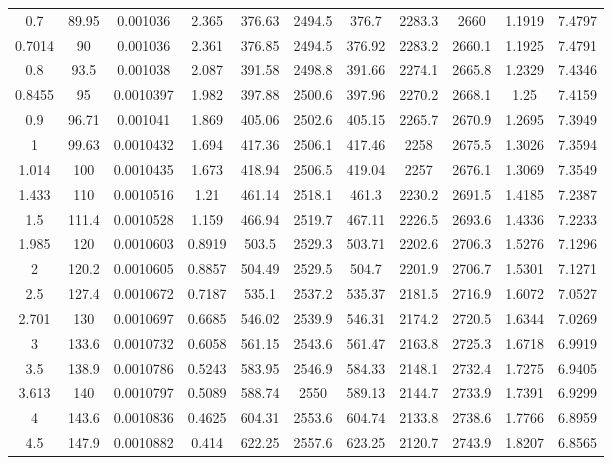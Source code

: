 \begin{longtable}{ccccccccccc}
	0.7     & 89.95 & 0.001036  & 2.365    & 376.63 & 2494.5 & 376.7  & 2283.3 & 2660   & 1.1919 & 7.4797      \\
	0.7014  & 90    & 0.001036  & 2.361    & 376.85 & 2494.5 & 376.92 & 2283.2 & 2660.1 & 1.1925 & 7.4791      \\
	0.8     & 93.5  & 0.001038  & 2.087    & 391.58 & 2498.8 & 391.66 & 2274.1 & 2665.8 & 1.2329 & 7.4346      \\
	0.8455  & 95    & 0.0010397 & 1.982    & 397.88 & 2500.6 & 397.96 & 2270.2 & 2668.1 & 1.25   & 7.4159      \\
	0.9     & 96.71 & 0.001041  & 1.869    & 405.06 & 2502.6 & 405.15 & 2265.7 & 2670.9 & 1.2695 & 7.3949      \\
	1       & 99.63 & 0.0010432 & 1.694    & 417.36 & 2506.1 & 417.46 & 2258   & 2675.5 & 1.3026 & 7.3594      \\
	1.014   & 100   & 0.0010435 & 1.673    & 418.94 & 2506.5 & 419.04 & 2257   & 2676.1 & 1.3069 & 7.3549      \\
	1.433   & 110   & 0.0010516 & 1.21     & 461.14 & 2518.1 & 461.3  & 2230.2 & 2691.5 & 1.4185 & 7.2387      \\
	1.5     & 111.4 & 0.0010528 & 1.159    & 466.94 & 2519.7 & 467.11 & 2226.5 & 2693.6 & 1.4336 & 7.2233      \\
	1.985   & 120   & 0.0010603 & 0.8919   & 503.5  & 2529.3 & 503.71 & 2202.6 & 2706.3 & 1.5276 & 7.1296      \\
	2       & 120.2 & 0.0010605 & 0.8857   & 504.49 & 2529.5 & 504.7  & 2201.9 & 2706.7 & 1.5301 & 7.1271      \\
	2.5     & 127.4 & 0.0010672 & 0.7187   & 535.1  & 2537.2 & 535.37 & 2181.5 & 2716.9 & 1.6072 & 7.0527      \\
	2.701   & 130   & 0.0010697 & 0.6685   & 546.02 & 2539.9 & 546.31 & 2174.2 & 2720.5 & 1.6344 & 7.0269      \\
	3       & 133.6 & 0.0010732 & 0.6058   & 561.15 & 2543.6 & 561.47 & 2163.8 & 2725.3 & 1.6718 & 6.9919      \\
	3.5     & 138.9 & 0.0010786 & 0.5243   & 583.95 & 2546.9 & 584.33 & 2148.1 & 2732.4 & 1.7275 & 6.9405      \\
	3.613   & 140   & 0.0010797 & 0.5089   & 588.74 & 2550   & 589.13 & 2144.7 & 2733.9 & 1.7391 & 6.9299      \\
	4       & 143.6 & 0.0010836 & 0.4625   & 604.31 & 2553.6 & 604.74 & 2133.8 & 2738.6 & 1.7766 & 6.8959      \\
	4.5     & 147.9 & 0.0010882 & 0.414    & 622.25 & 2557.6 & 623.25 & 2120.7 & 2743.9 & 1.8207 & 6.8565      \\

\end{longtable}
